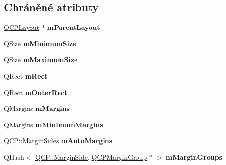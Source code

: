 \subsection*{Chráněné atributy}
\begin{DoxyCompactItemize}
\item 
\hypertarget{classQCPLayoutElement_ae7c75c25549608bd688bdb65d4c38066}{}\hyperlink{classQCPLayout}{Q\+C\+P\+Layout} $\ast$ {\bfseries m\+Parent\+Layout}\label{classQCPLayoutElement_ae7c75c25549608bd688bdb65d4c38066}

\item 
\hypertarget{classQCPLayoutElement_affef747c81632de33f08483b7fd10d01}{}Q\+Size {\bfseries m\+Minimum\+Size}\label{classQCPLayoutElement_affef747c81632de33f08483b7fd10d01}

\item 
\hypertarget{classQCPLayoutElement_a64a387973fd4addac842028c89088998}{}Q\+Size {\bfseries m\+Maximum\+Size}\label{classQCPLayoutElement_a64a387973fd4addac842028c89088998}

\item 
\hypertarget{classQCPLayoutElement_ad8896f05550389f7b9e92c9e6cdf6e01}{}Q\+Rect {\bfseries m\+Rect}\label{classQCPLayoutElement_ad8896f05550389f7b9e92c9e6cdf6e01}

\item 
\hypertarget{classQCPLayoutElement_a07bb4973379e75cb0fa5b032c1d24afd}{}Q\+Rect {\bfseries m\+Outer\+Rect}\label{classQCPLayoutElement_a07bb4973379e75cb0fa5b032c1d24afd}

\item 
\hypertarget{classQCPLayoutElement_ac2a32b99ee527ca5dfff9da03628fe94}{}Q\+Margins {\bfseries m\+Margins}\label{classQCPLayoutElement_ac2a32b99ee527ca5dfff9da03628fe94}

\item 
\hypertarget{classQCPLayoutElement_a5ba71f25d1af4bb092b28df618538e63}{}Q\+Margins {\bfseries m\+Minimum\+Margins}\label{classQCPLayoutElement_a5ba71f25d1af4bb092b28df618538e63}

\item 
\hypertarget{classQCPLayoutElement_af61c70354d1275778d68206b2a1b2d36}{}Q\+C\+P\+::\+Margin\+Sides {\bfseries m\+Auto\+Margins}\label{classQCPLayoutElement_af61c70354d1275778d68206b2a1b2d36}

\item 
\hypertarget{classQCPLayoutElement_aeafbbc1130e02eee663c5326761fc963}{}Q\+Hash$<$ \hyperlink{namespaceQCP_a7e487e3e2ccb62ab7771065bab7cae54}{Q\+C\+P\+::\+Margin\+Side}, \hyperlink{classQCPMarginGroup}{Q\+C\+P\+Margin\+Group} $\ast$ $>$ {\bfseries m\+Margin\+Groups}\label{classQCPLayoutElement_aeafbbc1130e02eee663c5326761fc963}

\end{DoxyCompactItemize}
